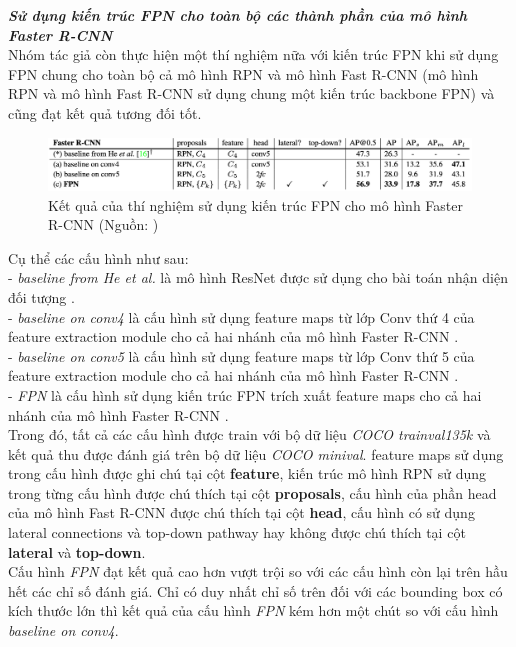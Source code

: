 {    \noindent
    \textbf{\textit{Sử dụng kiến trúc FPN cho toàn bộ các thành phần của mô hình Faster R-CNN}} \\
    Nhóm tác giả còn thực hiện một thí nghiệm nữa với kiến trúc FPN khi sử dụng FPN chung cho toàn bộ cả mô hình RPN  \cite{ren2015faster} và mô hình Fast R-CNN  (mô hình RPN  \cite{ren2015faster} và mô hình Fast R-CNN  sử dụng chung một kiến trúc backbone  FPN) và cũng đạt kết quả tương đối tốt.

    \begin{figure}[H]
        \centering
        \includegraphics[width=12cm] {images/fpn_results_3}
        \caption{Kết quả của thí nghiệm sử dụng kiến trúc FPN cho mô hình Faster R-CNN  (Nguồn: \cite{lin2017feature})}
        \label{fig:fpn_results_3}
    \end{figure}

    \noindent
    Cụ thể các cấu hình như sau: \\
    - \textit{baseline from He et al.} là mô hình ResNet được sử dụng cho bài toán nhận diện đối tượng . \\
    - \textit{baseline on conv4} là cấu hình sử dụng feature maps  từ lớp Conv  thứ 4 của feature extraction module  cho cả hai nhánh của mô hình Faster R-CNN . \\
    - \textit{baseline on conv5} là cấu hình sử dụng feature maps  từ lớp Conv  thứ 5 của feature extraction module  cho cả hai nhánh của mô hình Faster R-CNN . \\
    - \textit{FPN} là cấu hình sử dụng kiến trúc FPN trích xuất feature maps  cho cả hai nhánh của mô hình Faster R-CNN . \\
    Trong đó, tất cả các cấu hình được train với bộ dữ liệu \textit{COCO trainval135k} và kết quả thu được đánh giá trên bộ dữ liệu \textit{COCO minival}.
    feature maps  sử dụng trong cấu hình được ghi chú tại cột \textbf{feature}, kiến trúc mô hình RPN  \cite{ren2015faster} sử dụng trong từng cấu hình được chú thích tại cột \textbf{proposals}, cấu hình của phần head của mô hình Fast R-CNN  được chú thích tại cột \textbf{head}, cấu hình có sử dụng lateral connections  và top-down pathway hay không được chú thích tại cột \textbf{lateral} và \textbf{top-down}. \\
    Cấu hình \textit{FPN} đạt kết quả cao hơn vượt trội so với các cấu hình còn lại trên hầu hết các chỉ số đánh giá.
    Chỉ có duy nhất chỉ số trên đối với các bounding box  có kích thước lớn thì kết quả của cấu hình \textit{FPN} kém hơn một chút so với cấu hình \textit{baseline on conv4}.

}
